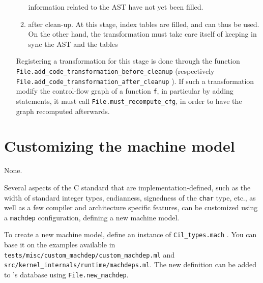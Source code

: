 \begin{enumerate}[A --]
\begin{enumerate}[1.]
    information related to the AST have not yet been filled.
  \item after clean-up. At this stage, index tables are filled, and can thus
    be used. On the other hand, the transformation must take care itself
    of keeping in sync the AST and the tables
  \end{enumerate}
  Registering a transformation for this stage is done through the function
  \verb+File.add_code_transformation_before_cleanup+%
  (respectively \verb+File.add_code_transformation_after_cleanup+%
  ). If such a
  transformation modify the control-flow graph of a function \texttt{f}, in
  particular by adding statements, it must call 
  \verb|File.must_recompute_cfg|, in
  order to have the graph recomputed afterwards.
\end{enumerate}


\section{Customizing the machine model}\label{sec:customizing-machdep}

\begin{prereq}
  None.
\end{prereq}

Several aspects of the C standard that are implementation-defined, such as
the width of standard integer types, endianness, signedness of the
\texttt{char} type, etc., as well as a few compiler and architecture specific
features, can be customized using a \texttt{machdep} configuration,
defining a new machine model.

To create a new machine model, define an instance of \verb+Cil_types.mach+%
. You can base it on the examples available in
\verb+tests/misc/custom_machdep/custom_machdep.ml+ and
\verb+src/kernel_internals/runtime/machdeps.ml+.
The new definition can be added to \framac's database using
\verb+File.new_machdep+.


